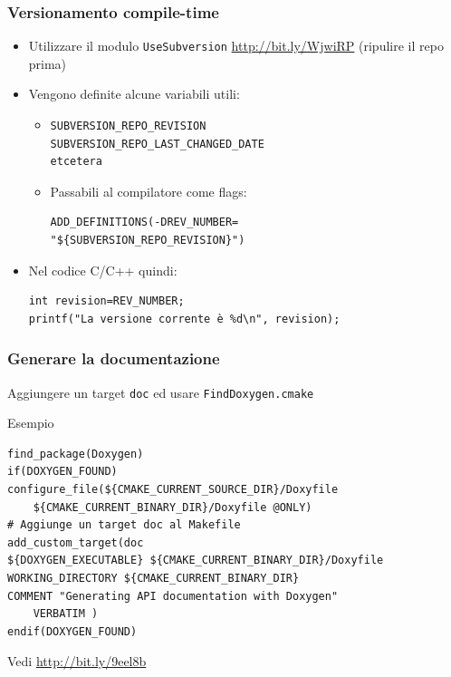 \documentclass[10pt] {beamer}
\begin{document}
\begin{frame}[fragile]
 \frametitle{Versionamento compile-time}
\begin{itemize}
 \item Utilizzare il modulo \texttt{UseSubversion} \url{http://bit.ly/WjwiRP} (ripulire il repo prima)
\item Vengono definite alcune variabili utili:
\begin{itemize}
\item 

\begin{small}
\begin{verbatim}
SUBVERSION_REPO_REVISION
SUBVERSION_REPO_LAST_CHANGED_DATE
etcetera
\end{verbatim}
\end{small}
\item Passabili al compilatore come flags:
\begin{small}
\begin{verbatim}
ADD_DEFINITIONS(-DREV_NUMBER=
"${SUBVERSION_REPO_REVISION}")
\end{verbatim}
\end{small}
\end{itemize}
\item Nel codice C/C++ quindi:
\begin{verbatim}
int revision=REV_NUMBER;
printf("La versione corrente è %d\n", revision);
\end{verbatim}
\end{itemize}
\end{frame}


\begin{frame}[fragile]
 \frametitle{Generare la documentazione}
Aggiungere un target \texttt{doc} ed usare \texttt{FindDoxygen.cmake}
\begin{block}{Esempio}
\begin{small}
\begin{verbatim}
find_package(Doxygen)
if(DOXYGEN_FOUND)
configure_file(${CMAKE_CURRENT_SOURCE_DIR}/Doxyfile 
    ${CMAKE_CURRENT_BINARY_DIR}/Doxyfile @ONLY)
# Aggiunge un target doc al Makefile 
add_custom_target(doc
${DOXYGEN_EXECUTABLE} ${CMAKE_CURRENT_BINARY_DIR}/Doxyfile
WORKING_DIRECTORY ${CMAKE_CURRENT_BINARY_DIR}
COMMENT "Generating API documentation with Doxygen" 
    VERBATIM )
endif(DOXYGEN_FOUND)
\end{verbatim}
\end{small}
\end{block}
Vedi \url{http://bit.ly/9eel8b}
\end{frame}
\end{document}
